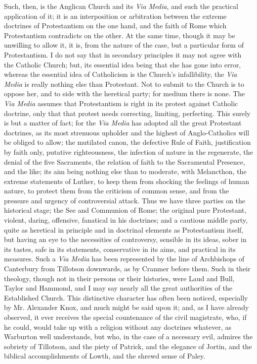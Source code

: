 Such, then, is the Anglican Church and its \emph{Via Media}, and such the
practical application of it; it is an interposition or arbitration
between the extreme doctrines of Protestantism on the one hand, and
the faith of Rome which Protestantism contradicts on the other. At the
same time, though it may be unwilling to allow it, it is, from the
nature of the case, but a particular form of Protestantism. I do not
say that in secondary principles it may not agree with the Catholic
Church; but, its essential idea being that she has gone into error,
whereas the essential idea of Catholicism is the Church's
infallibility, the \emph{Via Media} is really nothing else than
Protestant. Not to submit to the Church is to oppose her, and to side
with the heretical party; for medium there is none. The \emph{Via Media}
assumes that Protestantism is right in its protest against Catholic
doctrine, only that that protest needs correcting, limiting,
perfecting. This surely is but a matter of fact; for the \emph{Via Media}
has adopted all the great Protestant doctrines, as its most strenuous
upholder and the highest of Anglo-Catholics will be obliged to allow;
the mutilated canon, the defective Rule of Faith, justification by
faith only, putative righteousness, the infection of nature in the
regenerate, the denial of the five Sacraments, the relation of faith
to the Sacramental Presence, and the like; its aim being nothing else
than to moderate, with Melancthon, the extreme statements of Luther,
to keep them from shocking the feelings of human nature, to protect
them from the criticism of common sense, and from the pressure and
urgency of controversial attack. Thus we have three parties on the
historical stage; the See and Communion of Rome; the original pure
Protestant, violent, daring, offensive, fanatical in his doctrines;
and a cautious middle party, quite as heretical in principle and in
doctrinal elements as Protestantism itself, but having an eye to the
necessities of controversy, sensible in its ideas, sober in its
tastes, safe in its statements, conservative in its aims, and
practical in its measures. Such a \emph{Via Media} has been
represented by the line of Archbishops of Canterbury from Tillotson
downwards, as by Cranmer before them. Such in their theology, though
not in their persons or their histories, were Laud and Bull, Taylor
and Hammond, and I may say nearly all the great authorities of the
Established Church. This distinctive character has often been noticed,
especially by Mr. Alexander Knox, and much might be said upon it; and,
as I have already observed, it ever receives the special countenance
of the civil magistrate, who, if he could, would take up with a
religion without any doctrines whatever, as Warburton well
understands, but who, in the case of a necessary evil, admires the
sobriety of Tillotson, and the piety of Patrick, and the elegance of
Jortin, and the biblical accomplishments of Lowth, and the shrewd
sense of Paley.

